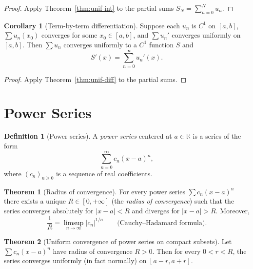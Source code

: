 \documentclass[12pt,a4paper]{book}
\theoremstyle{definition}
\newtheorem{definition}{Definition}[chapter]
\newtheorem{theorem}{Theorem}[chapter]
\newtheorem{corollary}{Corollary}[chapter]
\newcommand{\R}{\mathbb{R}}
\newcommand{\abs}[1]{\left\lvert #1 \right\rvert}
\begin{document}
\begin{proof}
  Apply Theorem~\ref{thm:unif-int} to the partial sums
  $S_N=\sum_{n=0}^N u_n$.
\end{proof}

\begin{corollary}[Term-by-term differentiation]\label{cor:termwise-diff}
  Suppose each $u_n$ is $C^1$ on $[a,b]$, $\sum u_n(x_0)$ converges for
  some $x_0\in[a,b]$, and $\sum u_n'$ converges uniformly on $[a,b]$.
  Then $\sum u_n$ converges uniformly to a $C^1$ function $S$ and
  \[
    S'(x) = \sum_{n=0}^{\infty}u_n'(x).
  \]
\end{corollary}

\begin{proof}
  Apply Theorem~\ref{thm:unif-diff} to the partial sums.
\end{proof}


\section{Power Series}\label{sec:power-series}

\begin{definition}[Power series]\label{def:power-series-def}
  A \emph{power series} centered at $a\in\R$ is a series of the form
  \[
    \sum_{n=0}^{\infty}c_n(x-a)^n,
  \]
  where $(c_n)_{n\ge0}$ is a sequence of real coefficients.
\end{definition}

\begin{theorem}[Radius of convergence]\label{thm:radius-conv}
  For every power series $\sum c_n(x-a)^n$ there exists a unique
  $R\in[0,+\infty]$ (the \emph{radius of convergence}) such that the
  series converges absolutely for $\abs{x-a}<R$ and diverges for
  $\abs{x-a}>R$.  Moreover,
  \[
    \frac{1}{R} = \limsup_{n\to\infty}\abs{c_n}^{1/n}
    \qquad\text{(Cauchy--Hadamard formula).}
  \]
\end{theorem}

\begin{theorem}[Uniform convergence of power series on compact subsets]\label{thm:power-unif-compact}
  Let $\sum c_n(x-a)^n$ have radius of convergence $R>0$.  Then for
  every $0<r<R$, the series converges uniformly (in fact normally) on
  $[a-r,a+r]$.
\end{theorem}
\end{document}
